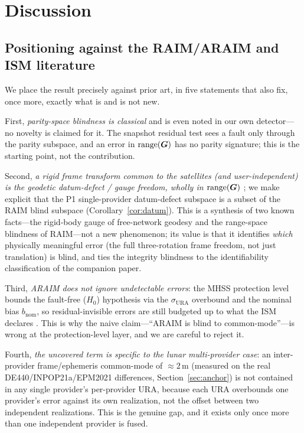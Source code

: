 \section{Discussion}
\label{sec:discussion}

\subsection{Positioning against the RAIM/ARAIM and ISM literature}
\label{sec:positioning}

We place the result precisely against prior art, in five statements that also fix, once
more, exactly what is and is not new.

First, \emph{parity-space blindness is classical} \citep{sturza1988,brown1992,%
parkinson1988} and is even noted in our own detector---no novelty is claimed for it. The
snapshot residual test sees a fault only through the parity subspace, and an error in
$\operatorname{range}(\bm{G})$ has no parity signature; this is the starting point, not the contribution.

Second, \emph{a rigid frame transform common to the satellites (and user-independent) is
the geodetic datum-defect / gauge freedom, wholly in $\operatorname{range}(\bm{G})$}
\citep{baarda1973,teunissen2000}; we make explicit that the P1 single-provider
datum-defect subspace \citep{baweja2026datum} is a subset of the RAIM blind subspace
(Corollary~\ref{cor:datum}). This is a synthesis of two known facts---the rigid-body
gauge of free-network geodesy and the range-space blindness of RAIM---not a new
phenomenon; its value is that it identifies \emph{which} physically meaningful error
(the full three-rotation frame freedom, not just translation) is blind, and ties the
integrity blindness to the identifiability classification of the companion paper.

Third, \emph{ARAIM does not ignore undetectable errors}: the MHSS protection level
\citep{blanch2015,wgc2016araim} bounds the fault-free ($H_0$) hypothesis via the
$\sigma_{\mathrm{URA}}$ overbound and the nominal bias $b_{\mathrm{nom}}$, so
residual-invisible errors are still budgeted up to what the ISM declares
\citep{decleene2000,montenbruck2018sisre}. This is why the naive claim---``ARAIM is
blind to common-mode''---is wrong at the protection-level layer, and we are careful to
reject it.

Fourth, \emph{the uncovered term is specific to the lunar multi-provider case}: an
inter-provider frame/ephemeris common-mode of $\approx\!2\,$m (measured on the real
DE440/INPOP21a/EPM2021 differences, Section~\ref{sec:anchor}) is not contained in any
single provider's per-provider URA, because each URA overbounds one provider's error
against its own realization, not the offset between two independent realizations. This is
the genuine gap, and it exists only once more than one independent provider is fused.

